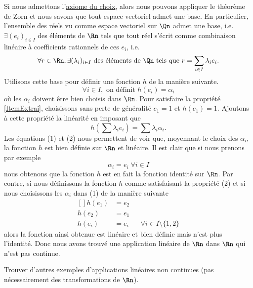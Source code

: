 Si nous admettons l'\href{http://fr.wikipedia.org/wiki/Axiome_du_choix}{axiome du choix}, alors nous pouvons appliquer le théorème de Zorn et nous savons que tout espace vectoriel admet une base. En particulier, l'ensemble des réels vu comme espace vectoriel sur $\Qn$ admet une base, i.e. $\exists (e_i)_{i\in I}$  des éléments de $\Rn$ tels que tout réel s'écrit comme combinaison linéaire à coefficients rationnels  de ces $e_i$, i.e.
\begin{equation}
	\forall r \in \Rn, \exists (\lambda_i)_{i\in I} \text{ des éléments de } \Qn \text{ tels que  } r = \sum_{i\in I} \lambda_i e_i.
\end{equation}
Utilisons cette base pour définir une fonction $h$ de la manière suivante.
\begin{equation}
\forall i \in I, \mbox{ on définit } h(e_i) = \alpha_i
\end{equation}
 où les $\alpha_i$ doivent être bien choisis dans $\Rn$. Pour satisfaire la propriété \ref{ItemExtrai}, choisissons sans perte de généralité $e_1 = 1$ et $h(e_1) = 1$.  Ajoutons à cette propriété la linéarité en imposant que 
\begin{equation}
h(\sum \lambda_i e_i) = \sum \lambda_i \alpha_i.
\end{equation}
Les équations (1) et (2) nous permettent de voir que, moyennant le choix des $\alpha_i$, la fonction $h$ est bien définie sur $\Rn$ et linéaire. Il est clair que si nous prenons par exemple
$$\alpha_i=e_i\;\forall i \in I$$ 
nous obtenons que la fonction $h$ est en fait la fonction identité sur $\Rn$. Par contre, si nous définissons la fonction $h$ comme satisfaisant la propriété (2) et si nous choisissons les $\alpha_i$ dans (1) de la manière suivante 
\begin{equation}
	\begin{aligned}[]
		h(e_1)	&= e_2\\
		h(e_2)	&= e_1\\
		h(e_i)	&= e_i	&&\forall i\in I\setminus\{ 1,2 \}
	\end{aligned}
\end{equation}
alors la fonction ainsi obtenue est linéaire et bien définie mais n'est plus l'identité. Donc nous avons trouvé une application linéaire de $\Rn$ dans $\Rn$ qui n'est pas continue.  

\begin{exercice}
 Trouver d'autres exemples d'applications linéaires non continues (pas nécessairement des transformations de $\Rn$). 		
\end{exercice}
